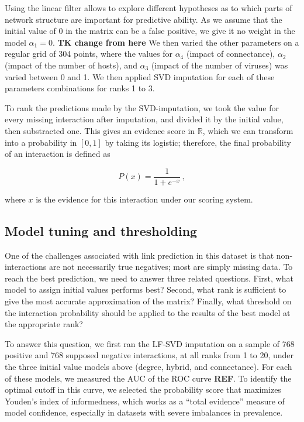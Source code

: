 \documentclass[11pt]{article}
\begin{document}
Using the linear filter allows to explore different hypotheses as to
which parts of network structure are important for predictive ability.
As we assume that the initial value of 0 in the matrix can be a false
positive, we give it no weight in the model \(\alpha_1 = 0\). \textbf{TK
change from here} We then varied the other parameters on a regular grid
of 304 points, where the values for \(\alpha_4\) (impact of
connectance), \(\alpha_2\) (impact of the number of hosts), and
\(\alpha_3\) (impact of the number of viruses) was varied between 0 and
1. We then applied SVD imputation for each of these parameters
combinations for ranks 1 to 3.

To rank the predictions made by the SVD-imputation, we took the value
for every missing interaction after imputation, and divided it by the
initial value, then substracted one. This gives an evidence score in
\(\mathbb{R}\), which we can transform into a probability in \([0,1]\)
by taking its logistic; therefore, the final probability of an
interaction is defined as

\[
P(x) = \frac{1}{1+e^{-x}}\,,
\]

where \(x\) is the evidence for this interaction under our scoring
system.

\hypertarget{model-tuning-and-thresholding}{%
\subsection{Model tuning and
thresholding}\label{model-tuning-and-thresholding}}

One of the challenges associated with link prediction in this dataset is
that non-interactions are not necessarily true negatives; most are
simply missing data. To reach the best prediction, we need to answer
three related questions. First, what model to assign initial values
performs best? Second, what rank is sufficient to give the most accurate
approximation of the matrix? Finally, what threshold on the interaction
probability should be applied to the results of the best model at the
appropriate rank?

To answer this question, we first ran the LF-SVD imputation on a sample
of 768 positive and 768 supposed negative interactions, at all ranks
from 1 to 20, under the three initial value models above (degree,
hybrid, and connectance). For each of these models, we measured the AUC
of the ROC curve \textbf{REF}. To identify the optimal cutoff in this
curve, we selected the probability score that maximizes Youden's index
of informedness, which works as a ``total evidence'' measure of model
confidence, especially in datasets with severe imbalances in prevalence.
\end{document}
